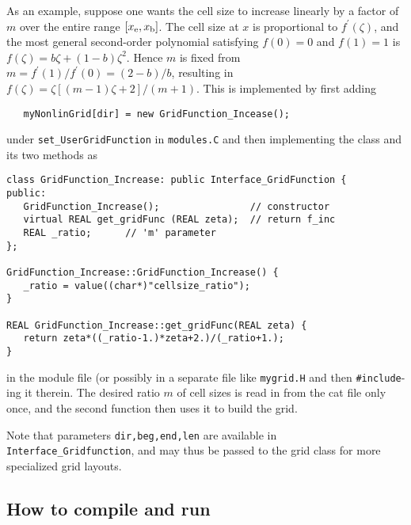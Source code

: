 As an example, suppose one wants the cell size to increase linearly
by a factor of $m$ over the entire range $[x_{\rm e}, x_{\rm b}]$. 
The cell size at $x$ is proportional to $f^{\prime}(\zeta)$, and the most
general second-order polynomial satisfying $f(0)=0$ and $f(1)=1$ is
$f(\zeta) = b \zeta + (1-b) \zeta^2$. Hence $m$ is fixed from
$m=f^{\prime}(1)/f^{\prime}(0) = (2-b)/b$, resulting in
$f(\zeta)= \zeta [ (m-1) \zeta +2]/(m+1)$.
This is implemented by first adding
\begin{verbatim}
   myNonlinGrid[dir] = new GridFunction_Incease();
\end{verbatim}
under \verb+set_UserGridFunction+ in \verb+modules.C+ and then
implementing the class and its two methods as
\begin{verbatim}
class GridFunction_Increase: public Interface_GridFunction {
public:
   GridFunction_Increase();                // constructor
   virtual REAL get_gridFunc (REAL zeta);  // return f_inc
   REAL _ratio;      // 'm' parameter
};

GridFunction_Increase::GridFunction_Increase() {
   _ratio = value((char*)"cellsize_ratio");
}

REAL GridFunction_Increase::get_gridFunc(REAL zeta) {
   return zeta*((_ratio-1.)*zeta+2.)/(_ratio+1.);
}
\end{verbatim}
in the module file (or possibly in a separate file like \verb+mygrid.H+
and then \verb+#include+-ing it therein. The desired ratio $m$ of cell
sizes is read in from the cat file only once, and the second function then
uses it to build the grid.

Note that parameters \verb+dir,beg,end,len+ are available in
\verb+Interface_Gridfunction+, and may thus be passed to the grid class
for more specialized grid layouts.

\subsection{How to compile and run}


